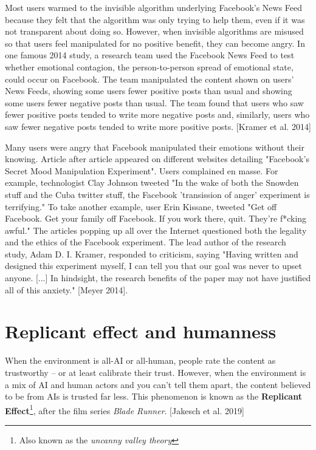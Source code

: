 \documentclass[class=book, crop=false]{standalone}
\providecommand{\keyterm}[1]{\textbf{#1}\marginnote{\scriptsize \textbf{#1}}}
\begin{document}
Most users warmed to the invisible algorithm underlying Facebook's News Feed because they felt that the algorithm was only trying to help them, even if it was not transparent about doing so. However, when invisible algorithms are misused so that users feel manipulated for no positive benefit, they can become angry. In one famous 2014 study, a research team used the Facebook News Feed to test whether emotional contagion, the person-to-person spread of emotional state, could occur on Facebook. The team manipulated the content shown on users' News Feeds, showing some users fewer positive posts than usual and showing some users fewer negative posts than usual. The team found that users who saw fewer positive posts tended to write more negative posts and, similarly, users who saw fewer negative posts tended to write more positive posts. [Kramer et al. 2014]

Many users were angry that Facebook manipulated their emotions without their knowing. Article after article appeared on different websites detailing "Facebook's Secret Mood Manipulation Experiment". Users complained en masse. For example, technologist Clay Johnson tweeted "In the wake of both the Snowden stuff and the Cuba twitter stuff, the Facebook 'transission of anger' experiment is terrifying." To take another example, user Erin Kissane, tweeted "Get off Facebook. Get your family off Facebook. If you work there, quit. They're f*cking awful." The articles popping up all over the Internet questioned both the legality and the ethics of the Facebook experiment. The lead author of the research study, Adam D. I. Kramer, responded to criticism, saying "Having written and designed this experiment myself, I can tell you that our goal was never to upset anyone. [...] In hindsight, the research benefits of the paper may not have justified all of this anxiety." [Meyer 2014].

\section{Replicant effect and humanness}

When the environment is all-AI or all-human, people rate the content as trustworthy -- or at least calibrate their trust. However, when the environment is a mix of AI and human actors and you can’t tell them apart, the content believed to be from AIs is trusted far less. This phenomenon is known as the \keyterm{Replicant Effect}\footnote{Also known as the \textit{uncanny valley theory}}, after the film series \textit{Blade Runner}. [Jakesch et al. 2019]
\end{document}
